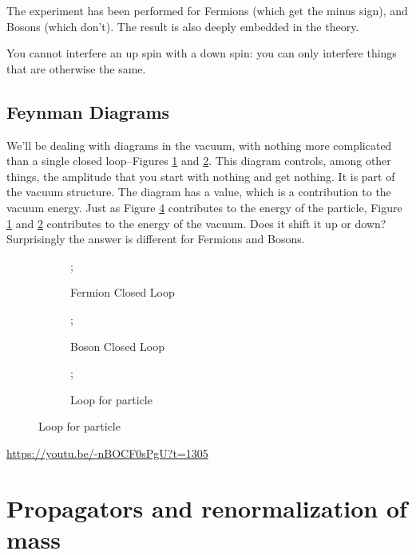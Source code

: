 \documentclass[]{article}
\begin{document}
The experiment has been performed for Fermions (which get the minus sign), and Bosons (which don't). The result is also deeply embedded in the theory.

You cannot interfere an up spin with a down spin: you can only interfere things that are otherwise the same.

\subsection{Feynman Diagrams}

We'll be dealing with diagrams in the vacuum, with nothing more complicated than a single closed loop--Figures \ref{fig:particles3-2-loops} and \ref{fig:particles3-2-loops-boson}. This diagram controls, among other things, the amplitude that you start with nothing and get nothing. It is part of the vacuum structure. The diagram has a  value, which is a contribution to the vacuum energy. Just as Figure \ref{fig:particles3-2-loops-p} contributes to the energy of the particle, Figure \ref{fig:particles3-2-loops} and \ref{fig:particles3-2-loops-boson} contributes to the energy of the vacuum. Does it shift it up or down? Surprisingly the answer is different for Fermions and Bosons.


\begin{figure}[H]
	\caption{Closed Loops Feynman diagrams}
	\begin{subfigure}[t]{0.3\textwidth}
		\caption{Fermion Closed Loop}\label{fig:particles3-2-loops}
		;
	\end{subfigure}
	\begin{subfigure}[t]{0.3\textwidth}
		\caption{Boson Closed Loop}\label{fig:particles3-2-loops-boson}
		;
	\end{subfigure}
	\begin{subfigure}[t]{0.3\textwidth}
		\caption{Loop for particle}\label{fig:particles3-2-loops-p}
		;
	\end{subfigure}
\end{figure}

\url{https://youtu.be/-nBOCF0sPgU?t=1305}

\section{Propagators and renormalization of mass}
\end{document}
